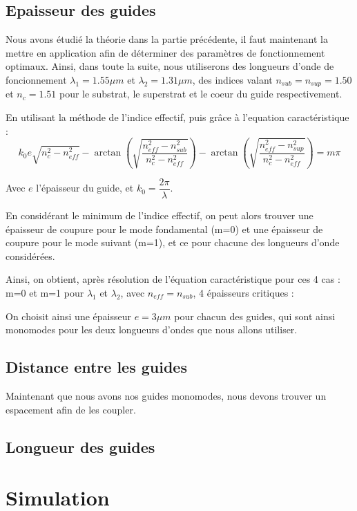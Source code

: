 \documentclass[a4paper,11pt]{report}
\begin{document}
\section{Epaisseur des guides}

Nous avons étudié la théorie dans la partie précédente, il faut maintenant la mettre en application afin de déterminer des paramètres de fonctionnement optimaux. Ainsi, dans toute la suite, nous utiliserons des longueurs d'onde de foncionnement $\lambda_1=1.55\mu m$ et $\lambda_2=1.31\mu m$, des indices valant $n_{sub}=n_{sup}=1.50$ et $n_{c}=1.51$ pour le substrat, le superstrat et le coeur du guide respectivement.

En utilisant la méthode de l'indice effectif, puis grâce à l'equation caractéristique :
\begin{equation}
    k_0e\sqrt{n_c^2-n_{eff}^2}-\arctan\left(\sqrt{\dfrac{n_{eff}^2-n_{sub}^2}{n_{c}^2-n_{eff}^2}}\right)-\arctan\left(\sqrt{\dfrac{n_{eff}^2-n_{sup}^2}{n_{c}^2-n_{eff}^2}}\right)=m\pi
\end{equation}

Avec $e$ l'épaisseur du guide, et $k_0=\dfrac{2\pi}{\lambda}$.

En considérant le minimum de l'indice effectif, on peut alors trouver une épaisseur de coupure pour le mode fondamental (m=0) et une épaisseur de coupure pour le mode suivant (m=1), et ce pour chacune des longueurs d'onde considérées.

Ainsi, on obtient, après résolution de l'équation caractéristique pour ces 4 cas : m=0 et m=1 pour $\lambda_1$ et $\lambda_2$, avec $n_{eff}=n_{sub}$, 4 épaisseurs critiques : %


On choisit ainsi une épaisseur $e=3\mu m$ pour chacun des guides, qui sont ainsi monomodes pour les deux longueurs d'ondes que nous allons utiliser.

\section{Distance entre les guides}
Maintenant que nous avons nos guides monomodes, nous devons trouver un espacement afin de les coupler.

\section{Longueur des guides}


\chapter{Simulation} 
\end{document}
